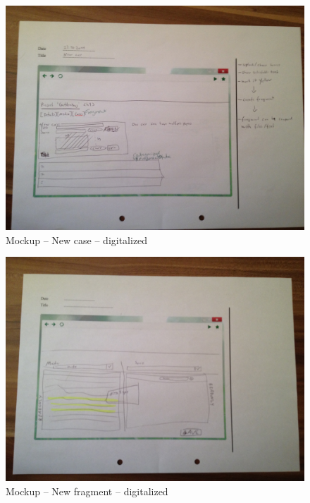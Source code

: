 \begin{appendix}
\begin{figure}[!h]
  \centering
    \includegraphics[width=\textwidth]{mockups/m_new_case.jpg}
  \caption{Mockup – New case – digitalized }
  \label{fig:1newCaseMockup}
\end{figure}

\begin{figure}[!h]
  \centering
    \includegraphics[width=\textwidth]{mockups/m_new_fragment.jpg}
  \caption{Mockup – New fragment – digitalized }
  \label{fig:1newCaseMockup}
\end{figure}


\end{appendix}

